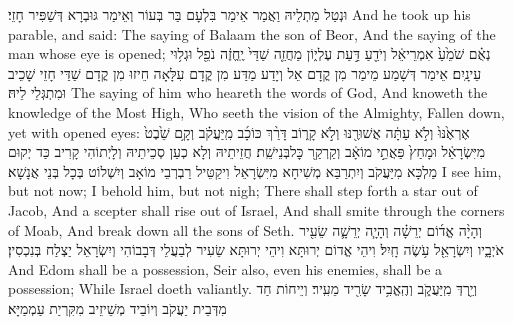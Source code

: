 {וּנְטַל מַתְלֵיהּ וַאֲמַר אֵימַר בִּלְעָם בַּר בְּעוֹר וְאֵימַר גּוּבְרָא דְּשַׁפִּיר חָזֵי׃}
{And he took up his parable, and said: The saying of Balaam the son of Beor, And the saying of the man whose eye is opened;}{}
{נְאֻ֗ם שֹׁמֵ֙עַ֙ אִמְרֵי\maqqaf אֵ֔ל וְיֹדֵ֖עַ דַּ֣עַת עֶלְי֑וֹן מַחֲזֵ֤ה שַׁדַּי֙ יֶֽחֱזֶ֔ה נֹפֵ֖ל וּגְל֥וּי עֵינָֽיִם׃}
{אֵימַר דְּשָׁמַע מֵימַר מִן קֳדָם אֵל וְיָדַע מַדַּע מִן קֳדָם עִלָּאָה חֵיזוּ מִן קֳדָם שַׁדַּי חָזֵי שָׁכֵיב וּמִתְגְּלֵי לֵיהּ׃}
{The saying of him who heareth the words of God, And knoweth the knowledge of the Most High, Who seeth the vision of the Almighty, Fallen down, yet with opened eyes:}{}
{אֶרְאֶ֙נּוּ֙ וְלֹ֣א עַתָּ֔ה אֲשׁוּרֶ֖נּוּ וְלֹ֣א קָר֑וֹב דָּרַ֨ךְ כּוֹכָ֜ב מִֽיַּעֲקֹ֗ב וְקָ֥ם שֵׁ֙בֶט֙ מִיִּשְׂרָאֵ֔ל וּמָחַץ֙ פַּאֲתֵ֣י מוֹאָ֔ב וְקַרְקַ֖ר כׇּל\maqqaf בְּנֵי\maqqaf שֵֽׁת׃}
{חֲזֵיתֵיהּ וְלָא כְעַן סְכֵיתֵיהּ וְלָיְתוֹהִי קָרִיב כַּד יְקוּם מַלְכָּא מִיַּעֲקֹב וְיִתְרַבַּא מְשִׁיחָא מִיִּשְׂרָאֵל וִיקַטֵּיל רַבְרְבֵי מוֹאָב וְיִשְׁלוֹט בְּכָל בְּנֵי אֲנָשָׁא׃}
{I see him, but not now; I behold him, but not nigh; There shall step forth a star out of Jacob, And a scepter shall rise out of Israel, And shall smite through the corners of Moab, And break down all the sons of Seth.}{}
{וְהָיָ֨ה אֱד֜וֹם יְרֵשָׁ֗ה וְהָיָ֧ה יְרֵשָׁ֛ה שֵׂעִ֖יר אֹיְבָ֑יו וְיִשְׂרָאֵ֖ל עֹ֥שֶׂה חָֽיִל׃}
{וִיהֵי אֱדוֹם יְרוּתָּא וִיהֵי יְרוּתָּא שֵׂעִיר לְבַעֲלֵי דְּבָבוֹהִי וְיִשְׂרָאֵל יַצְלַח בְּנִכְסִין׃}
{And Edom shall be a possession, Seir also, even his enemies, shall be a possession; While Israel doeth valiantly.}{}
{וְיֵ֖רְדְּ מִֽיַּעֲקֹ֑ב וְהֶֽאֱבִ֥יד שָׂרִ֖יד מֵעִֽיר׃}
{וְיֵיחוֹת חַד מִדְּבֵית יַעֲקֹב וְיוֹבֵיד מְשֵׁיזֵיב מִקִּרְיַת עַמְמַיָּא׃}
